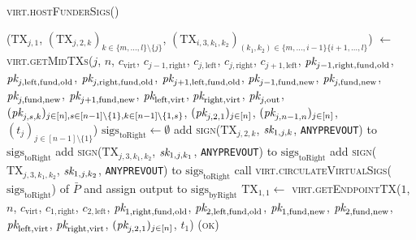 \begin{center}
  \begin{processbox}{\textsc{virt.hostFunderSigs}()}
    \begin{algorithmic}[1]
        \State ($\mathrm{TX}_{j, 1}$, $(\mathrm{TX}_{j, 2, k})_{k \in \{m,
        \dots, l\} \setminus \{j\}}$, $(\mathrm{TX}_{i, 3, k_1, k_2})_{(k_1,
        k_2) \in \{m, \dots, i-1\} \{i+1, \dots, l\}}$) $\gets$
        \textsc{virt.getMidTXs}($j$, $n$, $c_{\mathrm{virt}}$, $c_{j-1,
        \mathrm{right}}$, $c_{j, \mathrm{left}}$, $c_{j, \mathrm{right}}$,
        $c_{j+1, \mathrm{left}}$, $\textit{pk}_{j-1, \mathrm{right}, \mathrm{fund},
        \mathrm{old}}$, $\textit{pk}_{j, \mathrm{left}, \mathrm{fund}, \mathrm{old}}$,
        $\textit{pk}_{j, \mathrm{right}, \mathrm{fund}, \mathrm{old}}$, $\textit{pk}_{j+1,
        \mathrm{left}, \mathrm{fund}, \mathrm{old}}$, $\textit{pk}_{j-1, \mathrm{fund},
        \mathrm{new}}$, $\textit{pk}_{j, \mathrm{fund}, \mathrm{new}}$, $\textit{pk}_{j,
        \mathrm{fund}, \mathrm{new}}$, $\textit{pk}_{j+1, \mathrm{fund}, \mathrm{new}}$,
        $\textit{pk}_{\mathrm{left}, \mathrm{virt}}$, $\textit{pk}_{\mathrm{right},
        \mathrm{virt}}$, $\textit{pk}_{j, \mathrm{out}}$, $(\textit{pk}_{j,s,k})_{j \in [n], s \in
        [n-1] \setminus \{1\}, k \in [n-1] \setminus \{1, s\}}$, $(\textit{pk}_{j, 2,
        1})_{j \in [n]}$, $(\textit{pk}_{j, n-1, n})_{j \in [n]}$, $(t_j)_{j \in [n-1]
        \setminus \{1\}}$)
        \State $\mathrm{sigs}_{\mathrm{toRight}} \gets \emptyset$
          \State add \textsc{sign}($\mathrm{TX}_{j, 2, k}$, $\textit{sk}_{1, j, k}$,
          \texttt{ANYPREVOUT}) to $\mathrm{sigs}_{\mathrm{toRight}}$
        \EndFor
          \State add \textsc{sign}($\mathrm{TX}_{j, 3, k_1, k_2}$, $\textit{sk}_{1, j,
          k_1}$, \texttt{ANYPREVOUT}) to $\mathrm{sigs}_{\mathrm{toRight}}$
          \State add \textsc{sign}($\mathrm{TX}_{j, 3, k_1, k_2}$, $\textit{sk}_{1, j,
          k_2}$, \texttt{ANYPREVOUT}) to $\mathrm{sigs}_{\mathrm{toRight}}$
        \EndFor
      \EndFor
      \State call
      \textsc{virt.circulateVirtualSigs}($\mathrm{sigs}_{\mathrm{toRight}}$)
      of $\bar{P}$ and assign output to $\mathrm{sigs}_{\mathrm{byRight}}$
      \State $\mathrm{TX}_{1, 1} \gets$
      \textsc{virt}.\textsc{getEndpointTX}($1$, $n$, $c_{\mathrm{virt}}$,
      $c_{1, \mathrm{right}}$, $c_{2, \mathrm{left}}$, $\textit{pk}_{1,
      \mathrm{right}, \mathrm{fund}, \mathrm{old}}$, $\textit{pk}_{2, \mathrm{left},
      \mathrm{fund}, \mathrm{old}}$, $\textit{pk}_{1, \mathrm{fund}, \mathrm{new}}$,
      $\textit{pk}_{2, \mathrm{fund}, \mathrm{new}}$, $\textit{pk}_{\mathrm{left},
      \mathrm{virt}}$, $\textit{pk}_{\mathrm{right}, \mathrm{virt}}$, $(\textit{pk}_{j, 2,
      1})_{j \in [n]}$, $t_1$)
      \label{code:virtual-layer:fundee-sigs:tx}
      \label{code:virtual-layer:funder-sigs:tx-none}
      \State \Return (\textsc{ok})
    \end{algorithmic}
  \end{processbox}
  \label{code:virtual-layer:funder-sigs}
\end{center} \ \\

